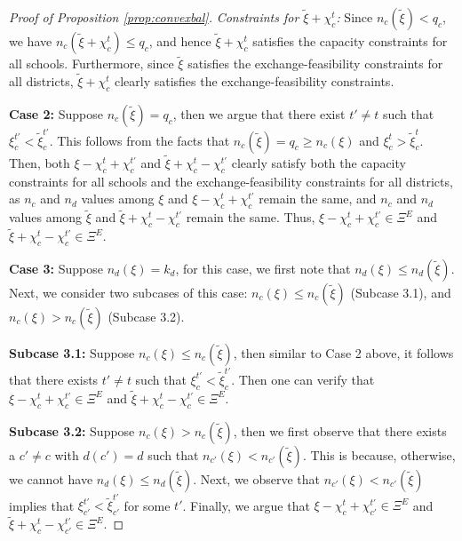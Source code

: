 \documentclass[12pt]{amsart}
\theoremstyle{remark}
\newcommand{\ieh}[1]{{\color{orange} IEH: #1 }}
\newcommand{\mby}[1]{{\color{blue} MBY: #1 }}
\begin{document}
\begin{proof}[Proof of Proposition \ref{prop:convexbal}]
\smallskip
\noindent \emph{Constraints for $\tilde \xi + \chi_c^t$:} Since $n_c(\tilde \xi) < q_c$, we have $n_c(\tilde \xi + \chi_c^t) \leq q_c$, and hence $\tilde \xi + \chi_c^t$ satisfies the capacity constraints for all schools. Furthermore, since $\tilde \xi$ satisfies the exchange-feasibility constraints for all districts,  $\tilde \xi + \chi_c^t$ clearly satisfies the exchange-feasibility constraints.

\textbf{Case 2:} Suppose $n_c(\tilde \xi) = q_c$, then we argue that there exist $t' \neq t$ such that $\xi_c^{t'} < \tilde{\xi}_{c}^{t'}$. This follows from the facts that $n_c(\tilde \xi)= q_c \geq n_c(\xi)$ and $\xi_c^t>\tilde{\xi}_{c}^{t}$. Then, both $\xi-\chi_c^t+\chi_{c}^{t'}$ and $\tilde{\xi}+\chi_c^t-\chi_{c}^{t'}$ clearly satisfy both the capacity constraints for all
schools and the exchange-feasibility constraints for all districts, as $n_c$ and $n_d$ values among $\xi$ and $\xi-\chi_c^t+\chi_{c}^{t'}$ remain the same, and $n_c$ and $n_d$ values among $\tilde \xi$ and $\tilde{\xi}+\chi_c^t-\chi_{c}^{t'}$ remain the same. Thus, $\xi-\chi_c^t+\chi_{c}^{t'} \in \Xi^E$ and $\tilde{\xi}+\chi_c^t-\chi_{c}^{t'}\in \Xi^E$.%

\textbf{Case 3:} Suppose $n_d(\xi) = k_{d}$, for this case, we first note that $n_d(\xi) \leq n_d(\tilde \xi)$. Next, we consider two subcases of this case: $n_c(\xi) \le n_c(\tilde \xi)$ (Subcase 3.1), and $n_c(\xi) > n_c(\tilde \xi)$ (Subcase 3.2).

\textbf{Subcase 3.1:} Suppose $n_c(\xi) \le n_c(\tilde \xi)$, then similar to Case 2 above, it follows that there exists $t' \neq t$ such that $\xi_c^{t'} < \tilde{\xi}_{c}^{t'}$. Then one can verify that $\xi-\chi_c^t+\chi_{c}^{t'} \in \Xi^E$ and $\tilde{\xi}+\chi_c^t-\chi_{c}^{t'}\in \Xi^E$.

\textbf{Subcase 3.2:} Suppose $n_c(\xi) > n_c(\tilde \xi)$, then we first observe that there exists a $c' \neq c$ with $d(c')=d$ such that
$n_{c'}(\xi) < n_{c'}(\tilde \xi)$. This is because, otherwise, we cannot have $n_d(\xi) \leq n_d(\tilde \xi)$. Next, we observe that $n_{c'}(\xi) < n_{c'}(\tilde \xi)$
implies that $ \xi_{c'}^{t'} <  \tilde{\xi}_{c'}^{t'}$ for some $t'$. Finally, we argue that $\xi-\chi_c^t+\chi_{c'}^{t'} \in \Xi^E$ and $\tilde{\xi}+\chi_c^t-\chi_{c'}^{t'}\in \Xi^E$.


\end{proof}
\end{document}
